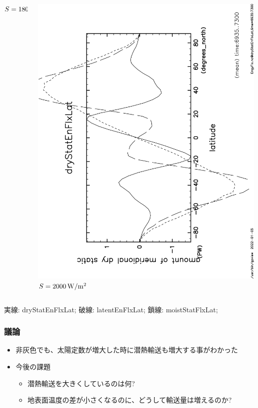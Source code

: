 \documentclass[aspectratio=149,9pt,fleqn]{beamer}
\begin{document}
\begin{frame}
\begin{columns}[T]
\begin{column}{.3\textwidth}
			\(S=1800\hmu{W/m^2}\)
		\end{column}
		\begin{column}{.3\textwidth}
			\centering
			\includegraphics[height=\textwidth,angle=-90]{S2000/EngyFlx,time=6935:7300-crop.pdf}
			\(S=2000\hmu{W/m^2}\)
		\end{column}
	\end{columns}
	実線: dryStatEnFlxLat; 破線: latentEnFlxLat; 鎖線: moistStatFlxLat;
\end{frame}

\begin{frame}
	\frametitle{議論}
	\begin{itemize}
		\item 非灰色でも、太陽定数が増大した時に潜熱輸送も増大する事がわかった
		\item 今後の課題
			\begin{itemize}
				\item 潜熱輸送を大きくしているのは何?
				\item 地表面温度の差が小さくなるのに、どうして輸送量は増えるのか?
			\end{itemize}
	\end{itemize}
\end{frame}
\end{document}
